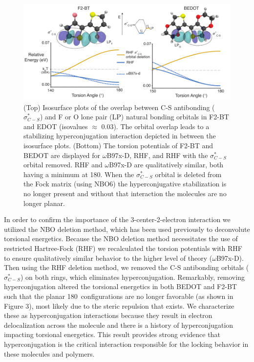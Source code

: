 \begin{figure}[hbt!]
    \centering
    \includegraphics{figures/chap3/fig3_d3.pdf}
    \caption{(Top) Isosurface plots of the overlap between C-S antibonding ($\sigma^{*}_{C-S}$) and F or O lone pair (LP) natural bonding orbitals in F2-BT and EDOT (isovalues $\approx$ 0.03). The orbital overlap leads to a stabilizing hyperconjugation interaction depicted in between the isosurface plots. (Bottom) The torsion potentials of F2-BT and BEDOT are displayed for $\omega$B97x-D, RHF, and RHF with the $\sigma^{*}_{C-S}$ orbital removed. RHF and $\omega$B97x-D are qualitatively similar, both having a minimum at 180\textdegree. When the $\sigma^{*}_{C-S}$ orbital is deleted from the Fock matrix (using NBO6) the hyperconjugative stabilization is no longer present and without that interaction the molecules are no longer planar.}
    \label{fig:nbo_del}
\end{figure}

In order to confirm the importance of the 3-center-2-electron interaction we utilized the NBO deletion method\cite{NBO6}, which has been used previously to deconvolute torsional energetics.\cite{Pophristic2001} Because the NBO deletion method necessitates the use of restricted Hartree-Fock (RHF) we recalculated the torsion potentials with RHF to ensure qualitatively similar behavior to the higher level of theory ($\omega$B97x-D). Then using the RHF deletion method, we removed the C-S antibonding orbitals ($\sigma^{*}_{C-S}$) on both rings, which eliminates hyperconjugation. Remarkably, removing hyperconjugation altered the torsional energetics in both BEDOT and F2-BT such that the planar 180\textdegree \ configurations are no longer favorable (as shown in Figure 3), most likely due to the steric repulsion that exists. We characterize these as hyperconjugation interactions because they result in electron delocalization across the molecule and there is a history of hyperconjugation impacting torsional energetics.\cite{Pophristic2001, R.Rablen1999} This result provides strong evidence that hyperconjugation is the critical interaction responsible for the locking behavior in these molecules and polymers.

